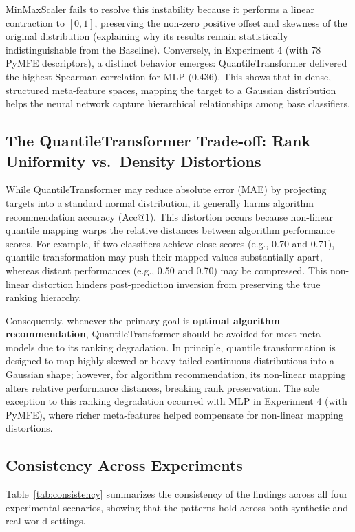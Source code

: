 \documentclass[12pt]{article}
\begin{document}
MinMaxScaler fails to resolve this instability because it performs a linear contraction to $[0, 1]$, preserving the non-zero positive offset and skewness of the original distribution (explaining why its results remain statistically indistinguishable from the Baseline). Conversely, in Experiment 4 (with 78 PyMFE descriptors), a distinct behavior emerges: QuantileTransformer delivered the highest Spearman correlation for MLP (0.436). This shows that in dense, structured meta-feature spaces, mapping the target to a Gaussian distribution helps the neural network capture hierarchical relationships among base classifiers.

\subsection{The QuantileTransformer Trade-off: Rank Uniformity vs.\ Density Distortions}

While QuantileTransformer may reduce absolute error (MAE) by projecting targets into a standard normal distribution, it generally harms algorithm recommendation accuracy (Acc@1). This distortion occurs because non-linear quantile mapping warps the relative distances between algorithm performance scores. For example, if two classifiers achieve close scores (e.g., 0.70 and 0.71), quantile transformation may push their mapped values substantially apart, whereas distant performances (e.g., 0.50 and 0.70) may be compressed. This non-linear distortion hinders post-prediction inversion from preserving the true ranking hierarchy.

Consequently, whenever the primary goal is \textbf{optimal algorithm recommendation}, QuantileTransformer should be avoided for most meta-models due to its ranking degradation. In principle, quantile transformation is designed to map highly skewed or heavy-tailed continuous distributions into a Gaussian shape; however, for algorithm recommendation, its non-linear mapping alters relative performance distances, breaking rank preservation. The sole exception to this ranking degradation occurred with MLP in Experiment 4 (with PyMFE), where richer meta-features helped compensate for non-linear mapping distortions.

\subsection{Consistency Across Experiments}

Table~\ref{tab:consistency} summarizes the consistency of the findings across all four experimental scenarios, showing that the patterns hold across both synthetic and real-world settings.
\end{document}
